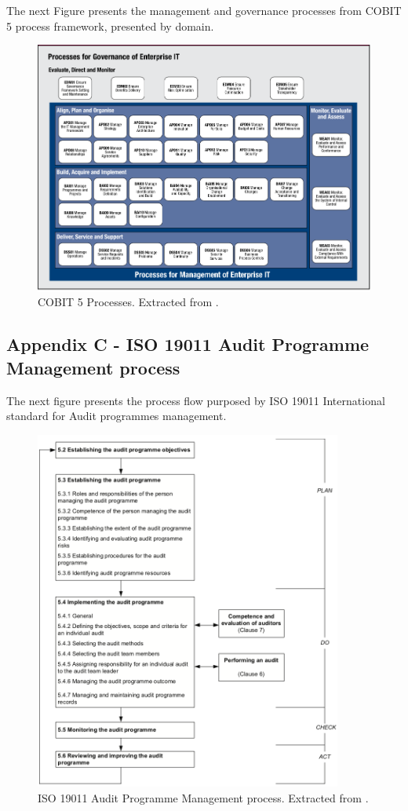 The next Figure presents the management and governance processes from COBIT 5 process framework, presented by domain.

\begin{figure}[h!]
\centering
\includegraphics[width=\textwidth]{img/COBIT5ProcessFramework.png}
\caption{COBIT 5 Processes. Extracted from \cite{2012cobit}.}
\end{figure}

\newpage

\subsection{Appendix C - ISO 19011 Audit Programme Management process} 

The next figure presents the process flow purposed by ISO 19011 International standard for Audit programmes management.

\begin{figure}[h!]
\centering
\includegraphics[width=0.9\textwidth]{img/ISO19011AuditProcess.png}
\caption{ISO 19011 Audit Programme Management process. Extracted from \cite{ISO19011}.}
\end{figure}




